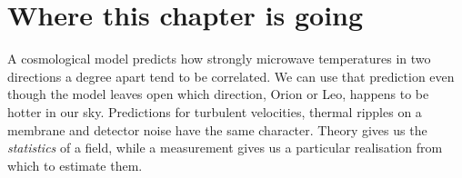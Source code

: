 \providecommand{\SevABmNpkDeg}{}\renewcommand{\SevABmNpkDeg}{0}
\providecommand{\SevABmLeqDeg}{}\renewcommand{\SevABmLeqDeg}{363}
\providecommand{\SevABmSigmaDeg}{}\renewcommand{\SevABmSigmaDeg}{25.5}
\providecommand{\SevABmLhalfThirty}{}\renewcommand{\SevABmLhalfThirty}{224}
\providecommand{\SevABmLhalfApproxThirty}{}\renewcommand{\SevABmLhalfApproxThirty}{225}
\providecommand{\SevABmNpkThirty}{}\renewcommand{\SevABmNpkThirty}{1}
\providecommand{\SevABmLeqThirty}{}\renewcommand{\SevABmLeqThirty}{654}
\providecommand{\SevABmSigmaThirty}{}\renewcommand{\SevABmSigmaThirty}{12.7}
\providecommand{\SevABmLhalfTen}{}\renewcommand{\SevABmLhalfTen}{673}
\providecommand{\SevABmLhalfApproxTen}{}\renewcommand{\SevABmLhalfApproxTen}{674}
\providecommand{\SevABmNpkTen}{}\renewcommand{\SevABmNpkTen}{2}
\providecommand{\SevABmLeqTen}{}\renewcommand{\SevABmLeqTen}{1479}
\providecommand{\SevABmSigmaTen}{}\renewcommand{\SevABmSigmaTen}{4.25}
\providecommand{\SevABmLhalfFive}{}\renewcommand{\SevABmLhalfFive}{1347}
\providecommand{\SevABmLhalfApproxFive}{}\renewcommand{\SevABmLhalfApproxFive}{1348}
\providecommand{\SevABmNpkFive}{}\renewcommand{\SevABmNpkFive}{4}
\providecommand{\SevABmLeqFive}{}\renewcommand{\SevABmLeqFive}{2014}
\providecommand{\SevABmSigmaFive}{}\renewcommand{\SevABmSigmaFive}{2.12}
 
\section*{Where this chapter is going}
\label{7a:sec:roadmap}

A cosmological model predicts how strongly microwave temperatures in two
directions a degree apart tend to be correlated. We can use that prediction
even though the model leaves open which direction, Orion or Leo, happens to
be hotter in our sky. Predictions for turbulent velocities, thermal ripples
on a membrane and detector noise have the same character. Theory gives us
the \emph{statistics} of a field, while a measurement gives us a particular
realisation from which to estimate them.

